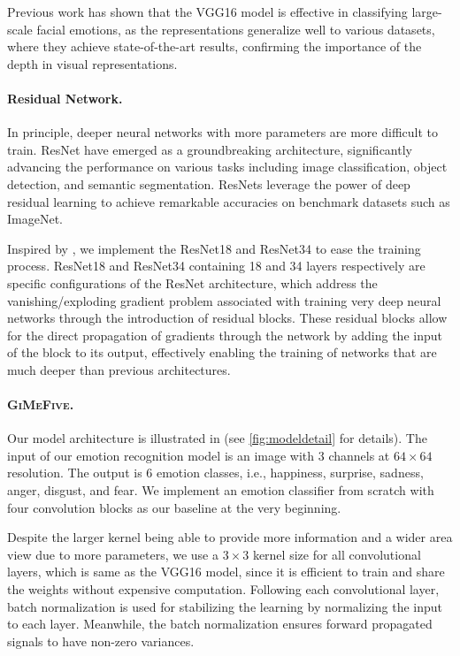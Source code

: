 Previous work has shown that the VGG16 model is effective in classifying large-scale facial emotions, 
as the representations generalize well to various datasets, 
where they achieve state-of-the-art results, 
confirming the importance of the depth in visual representations. 

\paragraph{Residual Network.}
In principle, 
deeper neural networks with more parameters are more difficult to train. 
ResNet have emerged as a groundbreaking architecture, 
significantly advancing the performance on various tasks including image classification, 
object detection, and semantic segmentation. 
ResNets leverage the power of deep residual learning to achieve remarkable accuracies on benchmark datasets such as ImageNet. 

Inspired by \citet{HeZRS16}, 
we implement the ResNet18 and ResNet34 to ease the training process. 
ResNet18 and ResNet34 containing 18 and 34 layers respectively are specific configurations of the ResNet architecture, 
which address the vanishing/exploding gradient problem associated with training very deep neural networks through the introduction of residual blocks. 
These residual blocks allow for the direct propagation of gradients through the network by adding the input of the block to its output, 
effectively enabling the training of networks that are much deeper than previous architectures. 

\paragraph{\textsc{GiMeFive}.}
Our model architecture is illustrated in  (see \cref{fig:modeldetail} for details). 
The input of our emotion recognition model is an image with 3 channels at $64 \times 64 $ resolution. 
The output is 6 emotion classes, i.e., happiness, surprise, sadness, anger, disgust, and fear. 
We implement an emotion classifier from scratch with four convolution blocks as our baseline at the very beginning. 

Despite the larger kernel being able to provide more information and a wider area view due to more parameters, 
we use a $3 \times 3$ kernel size for all convolutional layers, 
which is same as the VGG16 model, 
since it is efficient to train and share the weights without expensive computation. 
Following each convolutional layer, 
batch normalization is used for stabilizing the learning by normalizing the input to each layer. 
Meanwhile, 
the batch normalization ensures forward propagated signals to have non-zero variances. 

